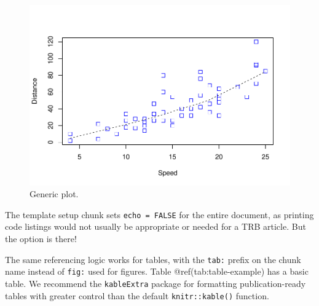 \documentclass[numbered]{trbunofficial}
\newenvironment{Shaded}{\begin{snugshade}}{\end{snugshade}}
\newcommand{\AttributeTok}[1]{\textcolor[rgb]{0.13,0.29,0.53}{#1}}
\newcommand{\CommentTok}[1]{\textcolor[rgb]{0.56,0.35,0.01}{\textit{#1}}}
\newcommand{\DecValTok}[1]{\textcolor[rgb]{0.00,0.00,0.81}{#1}}
\newcommand{\FloatTok}[1]{\textcolor[rgb]{0.00,0.00,0.81}{#1}}
\newcommand{\FunctionTok}[1]{\textcolor[rgb]{0.13,0.29,0.53}{\textbf{#1}}}
\newcommand{\NormalTok}[1]{#1}
\newcommand{\OtherTok}[1]{\textcolor[rgb]{0.56,0.35,0.01}{#1}}
\newcommand{\SpecialCharTok}[1]{\textcolor[rgb]{0.81,0.36,0.00}{\textbf{#1}}}
\newcommand{\StringTok}[1]{\textcolor[rgb]{0.31,0.60,0.02}{#1}}
\begin{document}
\begin{Shaded}
\end{Shaded}

\begin{figure}
\centering
\includegraphics{grocery_store_hamilton_files/figure-latex/figure-example-1.pdf}
\caption{Generic plot.}
\end{figure}

The template setup chunk sets \texttt{echo\ =\ FALSE} for the entire
document, as printing code listings would not usually be appropriate or
needed for a TRB article. But the option is there!

The same referencing logic works for tables, with the \texttt{tab:}
prefix on the chunk name instead of \texttt{fig:} used for figures.
Table @ref(tab:table-example) has a basic table. We recommend the
\texttt{kableExtra} package for formatting publication-ready tables with
greater control than the default \texttt{knitr::kable()} function.
\end{document}
